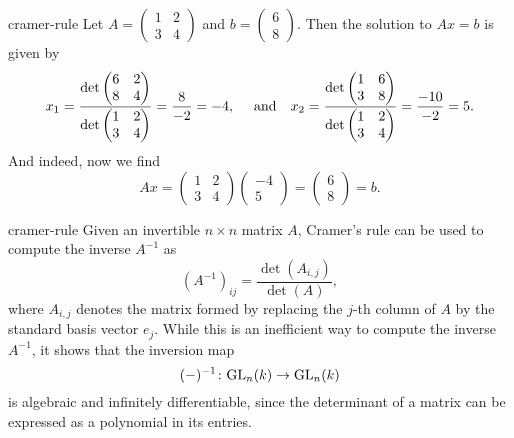\begin{example}{cramer-rule}
    Let $A = \begin{pmatrix} 1 & 2 \\ 3 & 4 \end{pmatrix}$ and $b = \begin{pmatrix} 6 \\ 8 \end{pmatrix}$. Then the solution to $Ax = b$ is given by
    \[ x_1 = \frac{\det \begin{pmatrix} 6 & 2 \\ 8 & 4 \end{pmatrix}}{\det \begin{pmatrix} 1 & 2 \\ 3 & 4 \end{pmatrix}} = \frac{8}{-2} = -4, \quad \textup{ and} \quad x_2 = \frac{\det \begin{pmatrix} 1 & 6 \\ 3 & 8 \end{pmatrix}}{\det \begin{pmatrix} 1 & 2 \\ 3 & 4 \end{pmatrix}} = \frac{-10}{-2} = 5 . \]
    And indeed, now we find
    \[ Ax = \begin{pmatrix} 1 & 2 \\ 3 & 4 \end{pmatrix} \begin{pmatrix} -4 \\ 5 \end{pmatrix} = \begin{pmatrix} 6 \\ 8 \end{pmatrix} = b . \]
\end{example}

\begin{example}{cramer-rule}
    Given an invertible $n \times n$ matrix $A$, Cramer's rule can be used to compute the inverse $A^{-1}$ as
    \[ \left( A^{-1} \right)_{ij} = \frac{\det(A_{i, j})}{\det(A)} , \]
    where $A_{i, j}$ denotes the matrix formed by replacing the $j$-th column of $A$ by the standard basis vector $e_j$. While this is an inefficient way to compute the inverse $A^{-1}$, it shows that the inversion map
    \[ (-)^{-1} \colon \textup{GL}_n(k) \to \textup{GL}_n(k) \]
    is algebraic and infinitely differentiable, since the determinant of a matrix can be expressed as a polynomial in its entries.
\end{example}

